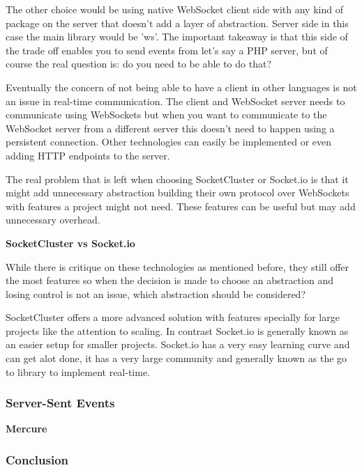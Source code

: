 The other choice would be using native WebSocket client side with any kind of package on the server that doesn't add a layer of abstraction. Server side in this case the main library would be 'ws'. The important takeaway is that this side of the trade off enables you to send events from let's say a PHP server, but of course the real question is: do you need to be able to do that?

Eventually the concern of not being able to have a client in other languages is not an issue in real-time communication. The client and WebSocket server needs to communicate using WebSockets but when you want to communicate to the WebSocket server from a different server this doesn't need to happen using a persistent connection. Other technologies can easily be implemented or even adding HTTP endpoints to the server.

The real problem that is left when choosing SocketCluster or Socket.io is that it might add unnecessary abstraction building their own protocol over WebSockets with features a project might not need. These features can be useful but may add unnecessary overhead.

\textbf{SocketCluster vs Socket.io}

While there is critique on these technologies as mentioned before, they still offer the most features so when the decision is made to choose an abstraction and losing control is not an issue, which abstraction should be considered?

SocketCluster offers a more advanced solution with features specially for large projects like the attention to scaling. In contrast Socket.io is generally known as an easier setup for smaller projects. Socket.io has a very easy learning curve and can get alot done, it has a very large community and generally known as the go to library to implement real-time.

\subsubsection{Server-Sent Events}

\textbf{Mercure}

\subsubsection{Conclusion}

